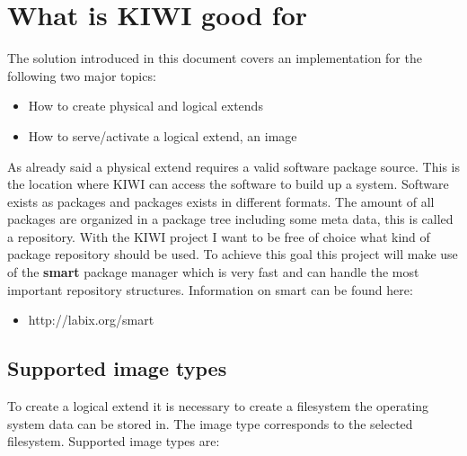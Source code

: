 
\section{What is KIWI good for}
The solution introduced in this document covers an implementation
for the following two major topics:

\begin{itemize}
	\item How to create physical and logical extends
	\item How to serve/activate a logical extend, an image
\end{itemize}

As already said a physical extend requires a valid software package
source. This is the location where KIWI can access the software to
build up a system. Software exists as packages and packages exists
in different formats. The amount of all packages are organized in
a package tree including some meta data, this is called a repository.
With the KIWI project I want to be free of choice what kind of
package repository should be used. To achieve this goal this project
will make use of the \textbf{smart} package manager which is very
fast and can handle the most important repository structures.
Information on smart can be found here:

\begin{itemize}
	\item http://labix.org/smart
\end{itemize}

\subsection{Supported image types}
To create a logical extend it is necessary to create a filesystem
the operating system data can be stored in. The image type corresponds
to the selected filesystem. Supported image types are:

